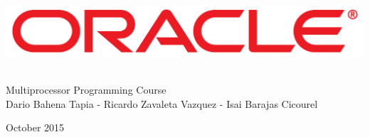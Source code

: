 \documentclass[letter,12pt]{article}
\begin{document}
\begin{titlepage}
\begin{center}

~\\[4 cm]

\includegraphics[width=15 cm]{Oracle_Logo.pdf}

~\\[0.5 cm]

{\LARGE Multiprocessor Programming Course} \\[0.2 cm]

{Dario Bahena Tapia - Ricardo Zavaleta Vazquez - Isai Barajas Cicourel}

{\small October 2015}

\end{center}
\end{titlepage}






\end{document}
